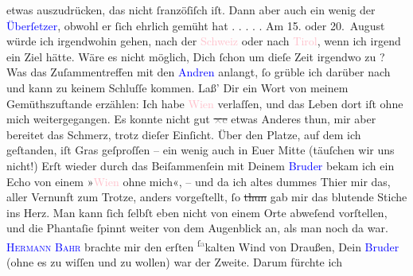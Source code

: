 \documentclass[twoside=false,titlepage=false,open=any, parskip=never, fontsize=12pt, headings=small, chapterprefix=false, appendixprefix=false]{scrbook}
\newcommand{\strikeout}[1]{\sout{#1}}
\newcommand{\dotsfive}{%
.\kern\ellipsisgap 
.\kern\ellipsisgap
.\kern\ellipsisgap
.\kern\ellipsisgap 
.\kern\ellipsisgap 
\relax}
\newcommand{\Theight}{\dimexpr\fontcharht\font`W}
\newcommand{\pbposition}{\depth}
\newcommand{\pb}{\nobreak\hspace{0pt}\raisebox{-0.1em}{\raisebox{\pbposition}{\textnormal{|}}}\nobreak\hspace{0pt}}
\newcommand{\substVorne}{\textnormal{\raisebox{\Theight}{\raisebox{-\height}{\rotatebox[origin=c]{180}{v}\normalsize}}}}
\newcommand{\substDazwischen}{}
\newcommand{\substHinten}{\textnormal{\raisebox{\Theight}{\raisebox{-\height}{\small{v}\normalsize}}}}
\begin{document}
               etwas auszudrücken, das nicht ſranzöſiſch iſt. Dann aber auch ein wenig {\pb}der \textcolor{blue}{Überſetzer}{}, obwohl er ſich ehrlich gemüht hat{\dotsfive}\pend
           \pstart
           Am 15. oder 20. August würde ich
               irgendwohin gehen, nach der \textcolor{pink}{Schweiz}{}\ledrightnote{\textcolor{pink}{Schweiz}} oder nach \textcolor{pink}{Tirol}{}\ledrightnote{\textcolor{pink}{Tirol}{\newline}\textcolor{pink}{Südtirol}}, wenn ich irgend ein Ziel hätte. Wäre es
               nicht möglich, Dich ſchon um dieſe Zeit irgendwo zu \label{K_L02608-3v}\label{K_L02608-3h}?\pend
           \pstart
           Was das Zuſammentreffen mit den \textcolor{blue}{Andren}{} anlangt, ſo grüble ich darüber nach und kann zu
               keinem Schluſſe kommen. Laß’ Dir ein Wort von meinem Gemüthszuftande erzählen: Ich
               habe \textcolor{pink}{Wien}{}\ledrightnote{\textcolor{pink}{Wien}} verlaſſen, und das Leben dort iſt ohne mich
               weitergegangen. Es konnte nicht gut \strikeout{\textcolor{gray}{×}\textcolor{gray}{e}} etwas Anderes {\pb}thun, mir aber bereitet das Schmerz, trotz dieſer
               Einſicht. Über den Platze, auf dem ich geſtanden, iſt Gras geſproſſen – ein wenig
               auch in Euer Mitte (täuſchen wir uns nicht!) Erſt wieder durch das Beiſammenſein mit
               Deinem \textcolor{blue}{Bruder}{} bekam ich ein
               Echo von einem »\textcolor{pink}{Wien}{}\ledrightnote{\textcolor{pink}{Wien}} ohne mich«, – und da ich altes
               dummes Thier mir das, aller Vernunft zum Trotze, anders vorgeſtellt, ſo \strikeout{thun} gab mir das blutende Stiche ins Herz. Man kann {\pb}ſich ſelbſt eben nicht von einem Orte abweſend
               vorſtellen, und die Phantaſie ſpinnt weiter von dem Augenblick an, als man noch da
               war. \textsc{\textcolor{blue}{Hermann Bahr}{}\ledrightnote{\textcolor{blue}{Hermann Bahr}}}
               brachte mir den erſten \substVorne{}\textsuperscript{ſ\textcolor{gray}{a}}\substDazwischen{}ka\substHinten{}lten Wind von Draußen, Dein \textcolor{blue}{Bruder}{} (ohne es zu wiſſen und zu wollen) war der Zweite. Darum fürchte ich
\end{document}
